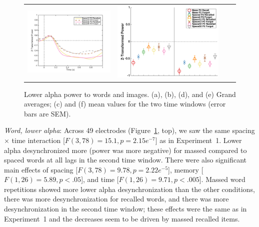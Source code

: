 \begin{figure}[H]
\begin{tabular}{cccc}
  \includegraphics[width=.30\textwidth]{./figs/exp2/tfr_line/tfr_line_ga_img_rc_spac12_p2_img_fo_spac12_p2_img_rc_spac32_p2_img_fo_spac32_p2_8_10_-100_1000_94ROIs_legend} &
  \includegraphics[width=.30\textwidth]{./figs/exp2/tfr_avg/tfr_avg_ga_img_rc_mass_p2_img_fo_mass_p2_img_rc_spac2_p2_img_fo_spac2_p2_img_rc_spac12_p2_img_fo_spac12_p2_img_rc_spac32_p2_img_fo_spac32_p2_8_10_0_500_500_1000_94ROI_ylabel} \\
  \end{tabular}
  \caption{Lower alpha power to words and images.  (a), (b), (d), and (e) Grand averages; (c) and (f) mean values for the two time windows (error bars are SEM).}
  \label{fig:s2_word_img_alpha_low}
\end{figure}


\textit{Word, lower alpha}: Across 49 electrodes (Figure~\ref{fig:s2_word_img_alpha_low}, top), we saw the same spacing $\times$ time interaction [$F(3,78)=15.1, p=2.15e^{-7}$] as in Experiment~1.  Lower alpha desynchronized more (power was more negative) for massed compared to spaced words at all lags in the second time window.  There were also significant main effects of spacing [$F(3,78)=9.78, p=2.22e^{-5}$], memory [$F(1,26)=5.89, p<.05$], and time [$F(1,26)=9.71, p<.005$].  Massed word repetitions showed more lower alpha desynchronization than the other conditions, there was more desynchronization for recalled words, and there was more desynchronization in the second time window; these effects were the same as in Experiment~1 and the decreases seem to be driven by massed recalled items.


